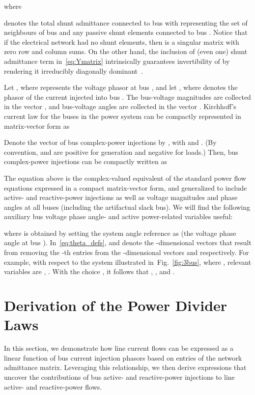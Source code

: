 \documentclass[journal]{IEEEtran}
\theoremstyle{definition}
\begin{document}
where 

denotes the total shunt admittance connected to bus  with  representing the set of neighbours of bus  and  any passive shunt elements connected to bus .  Notice that if the electrical network had no shunt elements, then  is a singular matrix with zero row and column sums. On the other hand, the inclusion of (even one) shunt admittance term in~\eqref{eq:Ymatrix} intrinsically guarantees invertibility of  by rendering it irreducibly diagonally dominant~\cite{Horn:2013}.

Let , where  represents the voltage phasor at bus , and let , where  denotes the phasor of the current injected into bus . The bus-voltage magnitudes are collected in the vector , and bus-voltage angles are collected in the vector . Kirchhoff's current law for the buses in the power system can be compactly represented in matrix-vector form as

Denote the vector of bus complex-power injections by , with  and . (By convention,  and  are positive for generation and negative for loads.)  Then, bus complex-power injections can be compactly written as

The equation above is the complex-valued equivalent of the standard power flow equations expressed in a compact matrix-vector form, and generalized to include active- and reactive-power injections as well as voltage magnitudes and phase angles at all buses (including the artifactual slack bus).     
We will find the following auxiliary bus voltage phase angle- and active power-related variables useful:

where  is obtained by setting the system angle reference as  (the voltage phase angle at bus ).  In~\eqref{eq:theta_defs},  and  denote the -dimensional vectors that result from removing the -th entries from the -dimensional vectors  and  respectively.  For example, with respect to the system illustrated in~Fig.~\ref{fig:3bus}, where , relevant variables are , .  With the choice  , it follows that , , and .

\section{Derivation of the Power Divider Laws}
\label{sec:line}

In this section, we demonstrate how line current flows can be expressed as a linear function of bus current injection phasors based on entries of the network admittance matrix.  Leveraging this relationship, we then derive expressions that uncover the contributions of bus active- and reactive-power  injections to line active- and reactive-power flows.
\end{document}
